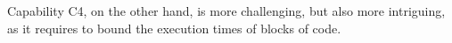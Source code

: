 Capability C4, on the other hand, is more challenging, but also more intriguing, as it requires to bound the execution times of blocks of code.

